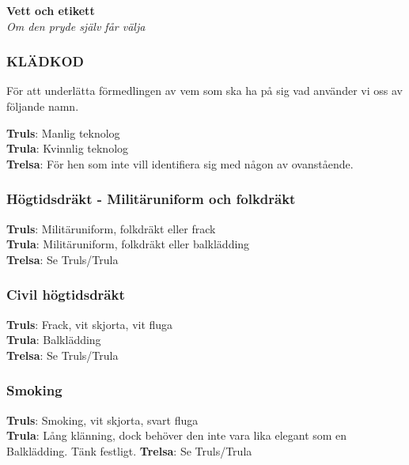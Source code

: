 \newpage

\tableofcontents

\newpage
\begin{center}
  \vspace*{1.5cm}
  {\fontsize{20}{20}\textbf{Vett och etikett}}\\
  \vspace{0.7cm}
  {\fontsize{12}{12}\textit{Om den pryde själv får välja}}
\end{center}
\noBackground
\newpage

\subsubsection*{KLÄDKOD}
För att underlätta förmedlingen av vem som ska ha på sig vad använder vi oss av följande namn.

\textbf{Truls}: Manlig teknolog\\
\textbf{Trula}: Kvinnlig teknolog\\
\textbf{Trelsa}: För hen som inte vill identifiera sig med någon av ovanstående.\\

\subsubsection*{Högtidsdräkt - Militäruniform och folkdräkt}

\textbf{Truls}: Militäruniform, folkdräkt eller frack\\
\textbf{Trula}: Militäruniform, folkdräkt eller balklädding\\
\textbf{Trelsa}: Se Truls/Trula\\

\subsubsection*{Civil högtidsdräkt}

\textbf{Truls}: Frack, vit skjorta, vit fluga\\
\textbf{Trula}: Balklädding\\
\textbf{Trelsa}: Se Truls/Trula\\

\subsubsection*{Smoking}
\textbf{Truls}: Smoking, vit skjorta, svart fluga\\
\textbf{Trula}: Lång klänning, dock behöver den inte vara lika elegant som en Balklädding. Tänk festligt.
\textbf{Trelsa}: Se Truls/Trula\\

